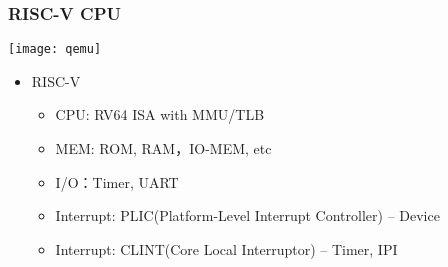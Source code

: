 





\begin{frame}
	\frametitle{RISC-V CPU}
	\centering
	\texttt{[image: qemu]}
	
	\begin{itemize}
		
		\item RISC-V
		\begin{itemize}
			\item CPU: RV64 ISA with MMU/TLB
			\item MEM: ROM, RAM，IO-MEM, etc
			\item I/O：Timer, UART
			\item Interrupt: PLIC(Platform-Level Interrupt Controller) -- Device
			\item Interrupt: CLINT(Core Local Interruptor) -- Timer, IPI 
		\end{itemize}

	\end{itemize}	
	
\end{frame}


